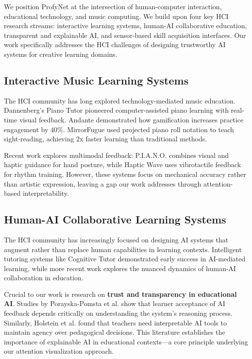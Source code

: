 \documentclass[sigconf,review,anonymous]{acmart}
\begin{document}
We position ProfyNet at the intersection of human-computer interaction, educational technology, and music computing. We build upon four key HCI research streams: interactive learning systems, human-AI collaborative education, transparent and explainable AI, and sensor-based skill acquisition interfaces. Our work specifically addresses the HCI challenges of designing trustworthy AI systems for creative learning domains.

\subsection{Interactive Music Learning Systems}

The HCI community has long explored technology-mediated music education. Dannenberg's Piano Tutor \cite{dannenberg2013} pioneered computer-assisted piano learning with real-time visual feedback. Andante \cite{andante2020} demonstrated how gamification increases practice engagement by 40\%. MirrorFugue \cite{xiao2014} used projected piano roll notation to teach sight-reading, achieving 2x faster learning than traditional methods.

Recent work explores multimodal feedback: P.I.A.N.O. \cite{oshima2021} combines visual and haptic guidance for hand posture, while Haptic Wave \cite{holland2010} uses vibrotactile feedback for rhythm training. However, these systems focus on mechanical accuracy rather than artistic expression, leaving a gap our work addresses through attention-based interpretability.

\subsection{Human-AI Collaborative Learning Systems}

The HCI community has increasingly focused on designing AI systems that augment rather than replace human capabilities in learning contexts. Intelligent tutoring systems like Cognitive Tutor \cite{anderson1995} demonstrated early success in AI-mediated learning, while more recent work explores the nuanced dynamics of human-AI collaboration in education. 

Crucial to our work is research on \textbf{trust and transparency in educational AI}. Studies by Porayska-Pomsta et al. \cite{porayska2013} show that learner acceptance of AI feedback depends critically on understanding the system's reasoning process. Similarly, Holstein et al. \cite{holstein2019} found that teachers need interpretable AI tools to maintain agency over pedagogical decisions. This literature establishes the importance of explainable AI in educational contexts—a core principle underlying our attention visualization approach.
\end{document}
